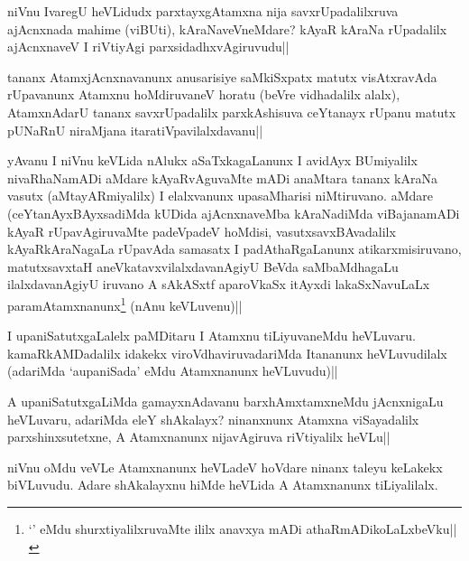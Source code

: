 \begin{artha}%
niVnu IvaregU heVLidudx parxtayxgAtamxna nija savxrUpadalilxruva ajAcnxnada mahime (viBUti), kAraNaveVneMdare? kAyaR kAraNa rUpadalilx ajAcnxnaveV I riVtiyAgi parxsidadhxvAgiruvudu||
\end{artha}


\begin{artha}
tananx AtamxjAcnxnavanunx anusarisiye saMkiSxpatx matutx visAtxravAda rUpavanunx Atamxnu hoMdiruvaneV horatu (beVre vidhadalilx alalx), AtamxnAdarU tananx savxrUpadalilx parxkAshisuva ceYtanayx rUpanu matutx pUNaRnU niraMjana itaratiVpavilalxdavanu||
\end{artha}

\begin{artha}
yAvanu I niVnu keVLida nAlukx aSaTxkagaLanunx I avidAyx BUmiyalilx nivaRhaNamADi aMdare kAyaRvAguvaMte mADi anaMtara tananx kAraNa vasutx (aMtayARmiyalilx) I elalxvanunx upasaMharisi niMtiruvano. aMdare (ceYtanAyxBAyxsadiMda kUDida ajAcnxnaveMba kAraNadiMda viBajanamADi kAyaR rUpavAgiruvaMte padeVpadeV hoMdisi, vasutxsavxBAvadalilx kAyaRkAraNagaLa rUpavAda samasatx I padAthaRgaLanunx atikarxmisiruvano, matutxsavxtaH aneVkatavxvilalxdavanAgiyU BeVda saMbaMdhagaLu ilalxdavanAgiyU iruvano A sAkASxtf aparoVkaSx itAyxdi lakaSxNavuLaLx paramAtamxnanunx\footnote[1]{`\stext ' eMdu shurxtiyalilxruvaMte ililx anavxya mADi athaRmADikoLaLxbeVku||} (nAnu keVLuvenu)||
\end{artha}%


\begin{artha}
I upaniSatutxgaLalelx paMDitaru I Atamxnu tiLiyuvaneMdu heVLuvaru. kamaRkAMDadalilx idakekx viroVdhaviruvadariMda Itananunx heVLuvudilalx (adariMda `aupaniSada' eMdu Atamxnanunx heVLuvudu)||
\end{artha}


\begin{artha}
A upaniSatutxgaLiMda gamayxnAdavanu barxhAmxtamxneMdu jAcnxnigaLu heVLuvaru, adariMda eleY shAkalayx? ninanxnunx Atamxna viSayadalilx parxshinxsutetxne, A Atamxnanunx nijavAgiruva riVtiyalilx heVLu||
\end{artha}

\begin{artha}%
niVnu oMdu veVLe Atamxnanunx heVLadeV hoVdare ninanx taleyu keLakekx biVLuvudu. Adare shAkalayxnu hiMde heVLida A Atamxnanunx tiLiyalilalx.
\end{artha}

